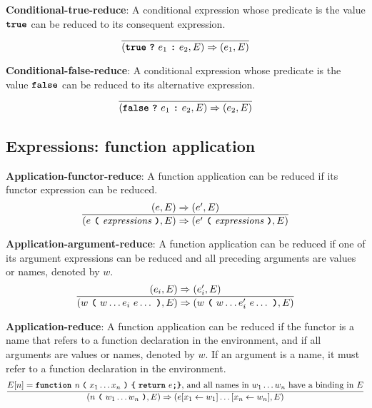 \vspace{10mm}
\textbf{Conditional-true-reduce}: A conditional
expression whose predicate is the value
$\textbf{\texttt{true}}$
can be reduced to its consequent expression.
\[
\frac{
}{
  (\textbf{\texttt{true}}\  \textbf{\texttt{?}}\ e_1\ \textbf{\texttt{:}}\ e_2, E)
  \Rightarrow
  (e_1, E)
}
\]

\vspace{10mm}
\textbf{Conditional-false-reduce}: A conditional
expression whose predicate is the value
$\textbf{\texttt{false}}$
can be reduced to its alternative expression.
\[
\frac{
}{
  (\textbf{\texttt{false}}\  \textbf{\texttt{?}}\ e_1\ \textbf{\texttt{:}}\ e_2, E)
  \Rightarrow
  (e_2, E)
}
\]


\subsection*{Expressions: function application}

\textbf{Application-functor-reduce}: A function application
can be reduced if its functor expression can be reduced.
\[
\frac{
  ( e , E ) \Rightarrow (e', E)
}{
  (e\  \textbf{\texttt{(}}\ \textit{expressions} \ \textbf{\texttt{)}}, E)
  \Rightarrow
  (e'\  \textbf{\texttt{(}}\ \textit{expressions} \ \textbf{\texttt{)}}, E)
}
\]

\vspace{10mm}
\textbf{Application-argument-reduce}: A function application
can be reduced if one of its argument expressions can be reduced and all
preceding arguments are values or names, denoted by $w$.
\[
\frac{
  ( e_i , E ) \Rightarrow (e_i', E)
}{
  (w\  \textbf{\texttt{(}}\ w \ldots e_i \ e \ldots\ \textbf{\texttt{)}}, E)
  \Rightarrow
  (w\  \textbf{\texttt{(}}\ w \ldots e_i' \ e \ldots\ \textbf{\texttt{)}}, E)
}
\]

\vspace{10mm}
\textbf{Application-reduce}: A function application
can be reduced if the functor is a name that refers to
a function declaration in the environment, and if all
arguments are values or names, denoted by $w$. If an argument
is a name, it must refer to a function declaration in the
environment.
\[
\frac{
  E[n] = \textbf{\texttt{function}}\  \textit{n}
                 \ \textbf{\texttt{(}}\  x_1 \ldots x_n
                 \ \textbf{\texttt{)}}\ \textbf{\texttt{\{}}\ \textbf{\texttt{return}}\ e \textbf{\texttt{;}} \textbf{\texttt{\}}}
\mbox{, and all names in $w_1 \ldots w_n$ have a binding in $E$}
}{
  (n\  \textbf{\texttt{(}}\ w_1 \ldots w_n\ \textbf{\texttt{)}}, E)
  \Rightarrow
  (e[x_1 \leftarrow w_1]\ldots[x_n \leftarrow w_n], E)
}
\]
